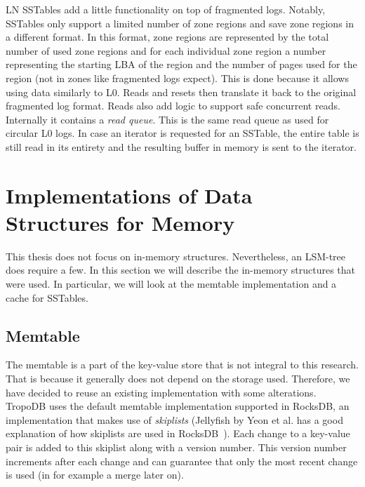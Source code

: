 LN SSTables add a little functionality on top of fragmented logs. Notably, SSTables only support a limited number of zone regions and save zone regions in a different format. In this format, zone regions are represented by the total number of used zone regions and for each individual zone region a number representing the starting LBA of the region and the number of pages used for the region (not in zones like fragmented logs expect). This is done because it allows using data similarly to L0. Reads and resets then translate it back to the original fragmented log format. Reads also add logic to support safe concurrent reads. Internally it contains a \textit{read queue}. This is the same read queue as used for circular L0 logs. In case an iterator is requested for an SSTable, the entire table is still read in its entirety and the resulting buffer in memory is sent to the iterator. 

\section{Implementations of Data Structures for Memory}
This thesis does not focus on in-memory structures. Nevertheless, an LSM-tree does require a few. In this section we will describe the in-memory structures that were used. In particular, we will look at the memtable implementation and a cache for SSTables. 

\subsection{Memtable}
\label{sec:memtable}
The memtable is a part of the key-value store that is not integral to this research. That is because it generally does not depend on the storage used. Therefore, we have decided to reuse an existing implementation with some alterations. TropoDB uses the default memtable implementation supported in RocksDB, an implementation that makes use of \textit{skiplists} (Jellyfish by Yeon et al. has a good explanation of how skiplists are used in RocksDB~\cite{yeon2020jellyfish}). Each change to a key-value pair is added to this skiplist along with a version number. This version number increments after each change and can guarantee that only the most recent change is used (in for example a merge later on).  

